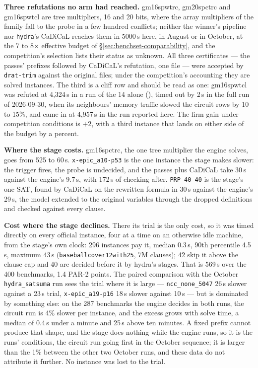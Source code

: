 \documentclass[10pt]{article}
\begin{document}
\textbf{Three refutations no arm had reached.} gm16spwtrc, gm20spctrc
and gm16spwtcl are tree multipliers, 16 and 20 bits, where the array
multipliers of the family fall to the probe in a few hundred conflicts;
neither the winner's pipeline nor \texttt{hydra}'s CaDiCaL reaches them
in 5000\,s here, in August or in October, at the 7 to 8$\times$
effective budget of \S\ref{sec:benchset-comparability}, and the
competition's selection lists their status as unknown. All three certificates --- the passes'
prefixes followed by CaDiCaL's refutation, one file --- were accepted by
\texttt{drat-trim} against the original files; under the competition's
accounting they are solved instances. The third is a cliff row and
should be read as one: gm16spwtcl was refuted at 4{,}324\,s in a run of
the 14 alone
(),
timed out by 2\,s in the full run of 2026-09-30, when its neighbours'
memory traffic slowed the circuit rows by 10 to 15\%, and came in at
4{,}957\,s in the run reported here. The firm gain under competition
conditions is $+2$, with a third instance that lands on either side of
the budget by a percent.

\textbf{Where the stage costs.} gm16spctrc, the one tree multiplier
the engine solves, goes from 525 to 60\,s. \texttt{x-epic\_a10-p53} is
the one instance the stage makes slower: the trigger fires, the probe is
undecided, and the passes plus CaDiCaL take 30\,s against the engine's
9.7\,s, with 172\,s of checking after. \texttt{PRP\_40\_40} is the
stage's one SAT, found by CaDiCaL on the rewritten formula in 30\,s
against the engine's 29\,s, the model extended to the original
variables through the dropped definitions and checked against every
clause.

\textbf{Cost where the stage declines.} There its trial is the only
cost, so it was timed directly on every official instance, four at a
time on an otherwise idle machine, from the stage's own clock: 296
instances pay it, median 0.3\,s, 90th percentile 4.5\,s, maximum
43\,s (\texttt{baseballcover12with25}, 7M clauses); 42 skip it above
the clause cap and 40 are decided before it by hydra's stages. That is
569\,s over the 400 benchmarks, 1.4 PAR-2 points. The paired
comparison with the October \texttt{hydra\_satsuma} run sees the trial
where it is large --- \texttt{ncc\_none\_5047} 26\,s slower against a
23\,s trial, \texttt{x-epic\_a19-p16} 18\,s slower against 10\,s ---
but is dominated by something else: on the 287 benchmarks the engine
decides in both runs, the circuit run is 4\% slower per instance, and
the excess grows with solve time, a median of 0.4\,s under a minute and
25\,s above ten minutes. A fixed prefix cannot produce that shape, and
the stage does nothing while the engine runs, so it is the runs'
conditions, the circuit run going first in the October sequence; it is
larger than the 1\% between the other two October runs, and these data
do not attribute it further. No instance was lost to the trial.
\end{document}
